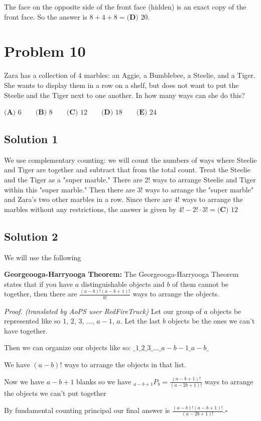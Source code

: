 \documentclass{article}
\begin{document}
The face on the opposite side of the front face (hidden) is an exact copy of the front face. So the answer is $8+4+8=\textbf{(D) }20$.
\section{Problem 10}
Zara has a collection of $4$ marbles: an Aggie, a Bumblebee, a Steelie, and a Tiger. She wants to display them in a row on a shelf, but does not want to put the Steelie and the Tiger next to one another. In how many ways can she do this?

$\textbf{(A) }6 \qquad \textbf{(B) }8 \qquad \textbf{(C) }12 \qquad \textbf{(D) }18 \qquad \textbf{(E) }24$
\subsection{Solution 1}
We use complementary counting: we will count the numbers of ways where Steelie and Tiger are together and subtract that from the total count. Treat the Steelie and the Tiger as a "super marble." There are $2!$ ways to arrange Steelie and Tiger within this "super marble." Then there are $3!$ ways to arrange the "super marble" and Zara's two other marbles in a row. Since there are $4!$ ways to arrange the marbles without any restrictions, the answer is given by $4!-2!\cdot 3!=\textbf{(C) }12$
\subsection{Solution 2}
We will use the following

\textbf{Georgeooga-Harryooga Theorem:} The Georgeooga-Harryooga Theorem states that if you have $a$ distinguishable objects and $b$ of them cannot be together, then there are $\frac{(a-b)!(a-b+1)!}{b!}$ ways to arrange the objects.

\textit{Proof. (translated by AoPS user RedFireTruck)}
Let our group of $a$ objects be represented like so $1$, $2$, $3$, ..., $a-1$, $a$. Let the last $b$ objects be the ones we can't have together.

Then we can organize our objects like so: $\_1\_2\_3\_...\_ a-b-1\_a-b\_$

We have $(a-b)!$ ways to arrange the objects in that list.

Now we have $a-b+1$ blanks so we have $_{a-b+1}P_{b}=\frac{(a-b+1)!}{(a-2b+1)!}$ ways to arrange the objects we can't put together

By fundamental counting principal our final answer is $\frac{(a-b)!(a-b+1)!}{(a-2b+1)!}$.$\square$
\end{document}
